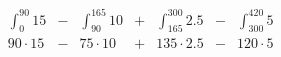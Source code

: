\documentclass[
	final,
	a4paper,
	oneside,
	parskip=full,
	headings=standardclasses,
	headings=big,
	pointednumbers
]{scrartcl}
\begin{document}
	
    
    \begin{align*}
        & \int_{0}^{90} 15 &-& \int_{90}^{165} 10 &+& \int_{165}^{300} 2.5 &-& \int_{300}^{420} 5 \\
        & 90 \cdot 15      &-& 75 \cdot 10        &+& 135 \cdot 2.5        &-& 120 \cdot 5 
    \end{align*}

	
\end{document}
